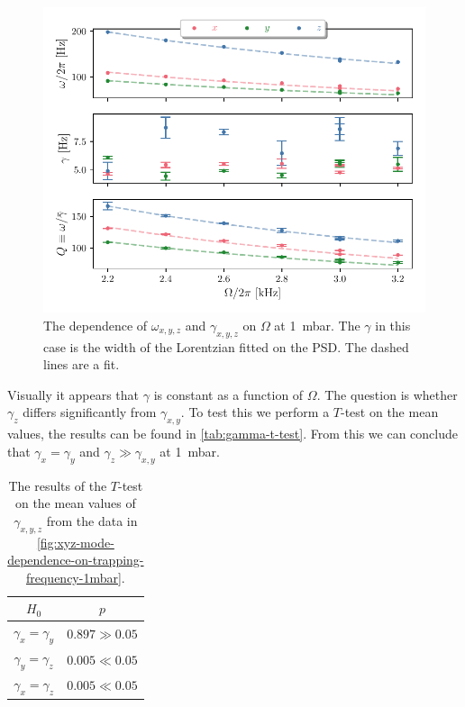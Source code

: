 \begin{figure}
    \centering
    \includegraphics{figures/data/xyz_mode_dependence_on_driving_frequency.pdf}
    \caption{The dependence of $\omega_{x,y,z}$ and $\gamma_{x,y,z}$ on $\Omega$ at \qty{1}{\milli\bar}. The $\gamma$ in this case is the width of the Lorentzian fitted on the PSD. The dashed lines are a fit.}
    \label{fig:xyz-mode-dependence-on-trapping-frequency-1mbar}
\end{figure}

Visually it appears that $\gamma$ is constant as a function of $\Omega$. The question is whether $\gamma_z$ differs significantly from $\gamma_{x,y}$. To test this we perform a $T$-test on the mean values, the results can be found in \autoref{tab:gamma-t-test}. From this we can conclude that $\gamma_x = \gamma_y$ and $\gamma_z \gg \gamma_{x,y}$ at \qty{1}{\milli\bar}.

\begin{table}
    \centering
    \begin{tabular}{cc}
        \toprule
        $H_0$ & $p$ \\
        \midrule
        $\gamma_x = \gamma_y$ & \textcolor{x_axis_color}{$0.897 \gg 0.05$} \\
        $\gamma_y = \gamma_z$ & \textcolor{y_axis_color}{$0.005 \ll 0.05$} \\
        $\gamma_x = \gamma_z$ & \textcolor{y_axis_color}{$0.005 \ll 0.05$} \\
        \bottomrule
    \end{tabular}
    \caption{The results of the $T$-test on the mean values of $\gamma_{x,y,z}$ from the data in \autoref{fig:xyz-mode-dependence-on-trapping-frequency-1mbar}.}
    \label{tab:gamma-t-test}
\end{table}



